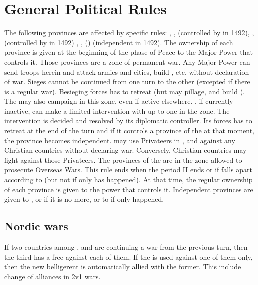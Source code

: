 
\section{General Political Rules}

\label{chSpecific:Balkans}

\aparag The following provinces are affected by specific rules:
, ,  (controlled by \TUR
in 1492), ,  (controlled by \VEN in 1492)
, ,  ()
(independent in 1492).
\aparag The ownership of each province is given at the beginning of the phase
of Peace to the Major Power that controls it.
\aparag Those provinces are a zone of permanent war. Any Major Power can send
troops herein and attack armies and cities, build \Presidios, etc.  without
declaration of war.
\bparag Sieges cannot be continued from one turn to the other (excepted if
there is a regular war). Besieging forces has to retreat (but may pillage, and
build \Presidios).
\bparag The \hab may also campaign in this zone, even if active elsewhere.
\bparag {}, if currently inactive, can make a limited intervention
with up to one \ARMY\faceplus in the zone. The intervention is decided and
resolved by its diplomatic controller. Its forces has to retreat at the end of
the turn and if it controls a province of the  at that moment,
the province becomes independent.
\aparag \TUR may use Privateers in ,  and 
against any Christian countries without declaring war.  Conversely, Christian
countries may fight against those Privateers.
\aparag The provinces of the  are in the zone allowed to
prosecute Overseas Wars.
\bparag This rule ends when the period II ends or if  falls
apart according to  (but not if only
 has happened).
\bparag At that time, the regular ownership of each province is given to the
power that controls it. Independent provinces are given to , or
 if it is no more, or to \HAB if only  happened.


\subsection{Nordic wars}
\aparag[] [BLP] If two countries among \POL, \RUS and \SUE are continuing a
war from the previous turn, then the third has a free \CB against each of
them.
\bparag If the \CB is used against one of them only, then the new belligerent
is automatically allied with the former.
\bparag This include change of alliances in 2v1 wars.

